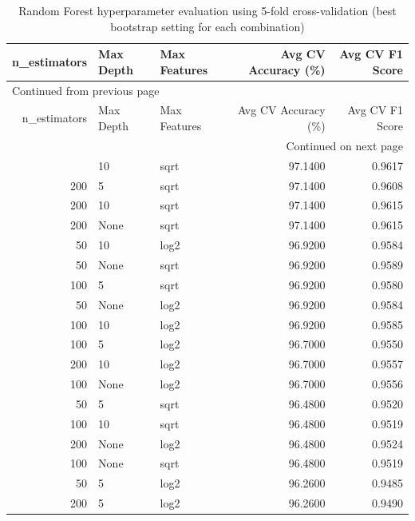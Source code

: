 \documentclass[11pt]{article}
\begin{document}
\begin{longtable}{|r|l|l|r|r|}
\caption{Random Forest hyperparameter evaluation using 5-fold cross-validation (best bootstrap setting for each combination)}
\\[0pt]
\hline
n\_estimators & Max Depth & Max Features & Avg CV Accuracy (\%) & Avg CV F1 Score\\[0pt]
\hline
\endfirsthead
\multicolumn{5}{l}{Continued from previous page} \\[0pt]
\hline

n\_estimators & Max Depth & Max Features & Avg CV Accuracy (\%) & Avg CV F1 Score \\[0pt]

\hline
\endhead
\hline\multicolumn{5}{r}{Continued on next page} \\
\endfoot
\endlastfoot
\hline
50 & 10 & sqrt & 97.1400 & 0.9617\\[0pt]
\hline
200 & 5 & sqrt & 97.1400 & 0.9608\\[0pt]
\hline
200 & 10 & sqrt & 97.1400 & 0.9615\\[0pt]
\hline
200 & None & sqrt & 97.1400 & 0.9615\\[0pt]
\hline
50 & 10 & log2 & 96.9200 & 0.9584\\[0pt]
\hline
50 & None & sqrt & 96.9200 & 0.9589\\[0pt]
\hline
100 & 5 & sqrt & 96.9200 & 0.9580\\[0pt]
\hline
50 & None & log2 & 96.9200 & 0.9584\\[0pt]
\hline
100 & 10 & log2 & 96.9200 & 0.9585\\[0pt]
\hline
100 & 5 & log2 & 96.7000 & 0.9550\\[0pt]
\hline
200 & 10 & log2 & 96.7000 & 0.9557\\[0pt]
\hline
100 & None & log2 & 96.7000 & 0.9556\\[0pt]
\hline
50 & 5 & sqrt & 96.4800 & 0.9520\\[0pt]
\hline
100 & 10 & sqrt & 96.4800 & 0.9519\\[0pt]
\hline
200 & None & log2 & 96.4800 & 0.9524\\[0pt]
\hline
100 & None & sqrt & 96.4800 & 0.9519\\[0pt]
\hline
50 & 5 & log2 & 96.2600 & 0.9485\\[0pt]
\hline
200 & 5 & log2 & 96.2600 & 0.9490\\[0pt]
\hline
\end{longtable}
\end{document}
